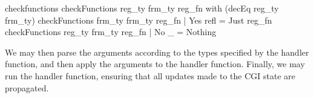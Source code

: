 \begin{SaveVerbatim}{checkfunctions}
checkFunctions reg_ty frm_ty reg_fn with 
                             (decEq reg_ty frm_ty)
  checkFunctions frm_ty frm_ty reg_fn 
                        | Yes refl = Just reg_fn
  checkFunctions reg_ty frm_ty reg_fn 
                        | No _ = Nothing

\end{SaveVerbatim}



\noindent
We may then parse the arguments according to the types specified by the handler
function, and then apply the arguments to the handler function.
Finally, we may run the handler function, ensuring that
all updates made to the CGI state are propagated.

